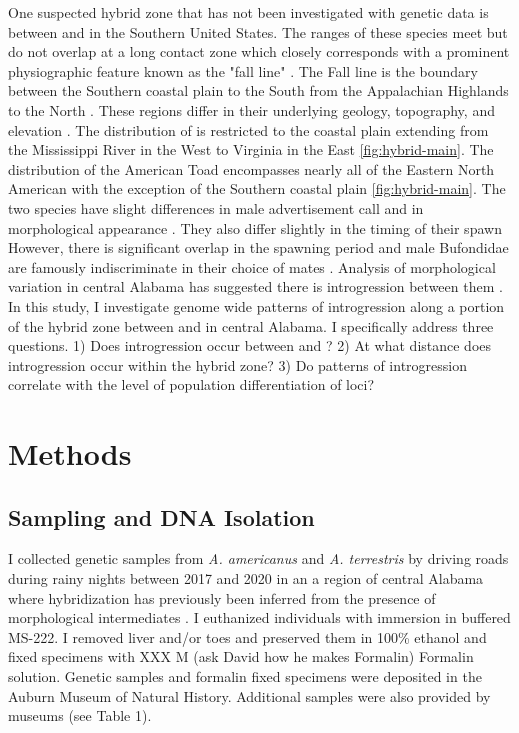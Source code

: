 One suspected hybrid zone that has not been investigated with genetic data is 
between \amer and \terr in the Southern United States.
The ranges of these species meet but do not overlap at a long contact zone which
closely corresponds with a prominent physiographic feature known as the "fall line" \parencite{powell2016,mount1975}. 
The Fall line is the boundary between the Southern coastal plain to the South from 
the Appalachian Highlands to the North \parencite{shankman2007}.
These regions differ in their underlying geology, topography, and elevation \parencite{shankman2007}.
The distribution of \terr is restricted to the coastal plain extending from   
the Mississippi River in the West to Virginia in the East \cref{fig:hybrid-main}.
The distribution of the American Toad encompasses nearly all of the Eastern North 
American with the exception of the Southern coastal plain \cref{fig:hybrid-main}.
The two species have slight differences in male advertisement call and in 
morphological appearance \parencite{cocroft1995,weatherby1982}. 
They also differ slightly in the timing of their spawn \parencite{mount1975} 
However, there is significant overlap in the spawning period and male Bufondidae 
are famously indiscriminate in their choice of mates \parencite{dordevic2014,weatherby1982}.
Analysis of morphological variation in central Alabama has suggested there is 
introgression between them \parencite{weatherby1982}.
In this study, I investigate genome wide patterns of introgression along a portion
of the hybrid zone between \amer and \terr in central Alabama. 
I specifically address three questions.
1) Does introgression occur between \amer and \terr?
2) At what distance does introgression occur within the hybrid zone? 
3) Do patterns of introgression correlate with the level of population differentiation
of loci?



\section{Methods}
\subsection{Sampling and DNA Isolation}
I collected genetic samples from \textit{A. americanus} and \textit{A. terrestris}
by driving roads during rainy nights between 2017 and 2020
in an a region of central Alabama where hybridization has previously been
inferred from the presence of morphological intermediates \parencite{weatherby1982}. 
I euthanized individuals with immersion in buffered MS-222.
I removed liver and/or toes and preserved them in 100\% ethanol and fixed 
specimens with XXX M (ask David how he makes Formalin) Formalin solution.
Genetic samples and formalin fixed specimens were deposited in the Auburn Museum of Natural History.
Additional samples were also provided by museums (see Table 1).

